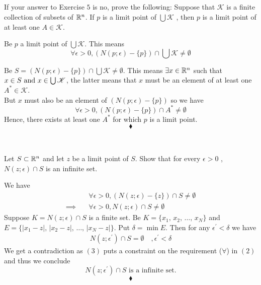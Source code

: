 \subsection{}
\begin{tcolorbox}
If your answer to Exercise $5$ is no, prove the following: Suppose that $\mathscr{K}$ is a finite collection of subsets of $\mathbb{R}^n$. If $p$ is a limit point of $\bigcup \mathscr{K}$ , then $p$ is a limit point of at least one $A \in \mathscr{K}$.
\end{tcolorbox}
Be $p$ a limit point of $\bigcup \mathscr{K}$. This means
$$\forall  \epsilon >0, \left(N(p;\epsilon)-\{p\}\right)\cap \bigcup \mathscr{K}\neq \emptyset$$

Be $S=\left(N(p;\epsilon)-\{p\}\right)\cap \bigcup \mathscr{K}\neq \emptyset$. This means $\exists x\in\mathbb{R}^n$ such that $ x\in S\text{ and } x\in \bigcup\mathscr{K}$, the latter means that $x$ must be an element of at least one $A^{*}\in \mathscr{K}$.\\
But $x$ must also be an element of $\left(N(p;\epsilon)-\{p\}\right)$ so we have 
$$\forall  \epsilon >0, \left(N(p;\epsilon)-\{p\}\right)\cap A^{*}\neq \emptyset$$
Hence, there exists at least one $A^*$ for which $p$ is a limit point.
$$\blacklozenge$$\\

\subsection{}
\begin{tcolorbox}
Let $S\subset \mathbb{R}^n$  and let $z$ be a limit point of $S$. Show that for every $\epsilon > 0$ , $N(z; \epsilon)\cap S$ is an infinite set.
\end{tcolorbox}
We have 
\begin{align}
&\forall  \epsilon >0, \left(N(z;\epsilon)-\{z\}\right)\cap S\neq \emptyset\\
\implies \quad &\forall  \epsilon >0, N(z;\epsilon)\cap S\neq \emptyset
\end{align}
Suppose $K=N(z;\epsilon)\cap S$ is a finite set. Be $K=\{x_1,\, x_2,\, \dots ,\, x_N\}$ and $E=\{|x_1-z|,\, |x_2-z|,\, \dots ,\, |x_N-z|\}$. Put $\delta = \min{E}$. Then for any $\epsilon^{'}<\delta $ we have 
\begin{align}
N(z;\epsilon^{'})\cap S=\emptyset\quad , \epsilon^{'}<\delta 
\end{align}
We get a contradiction as $(3)$ puts a constraint on the requirement ($\forall$) in  $(2)$  and thus we conclude \\
$$N(z;\epsilon^{'})\cap S\text{ is a infinite set.}$$
$$\blacklozenge$$\\


